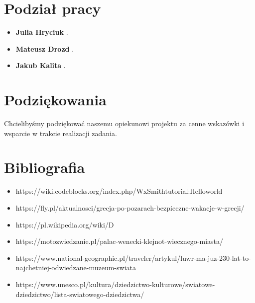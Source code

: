 \documentclass{article}
\begin{document}
	\section{Podział pracy}
\begin{itemize}
	\item \textbf {Julia Hryciuk} .
	\item \textbf {Mateusz Drozd} .
	\item \textbf {Jakub Kalita} .
\end{itemize}
	\section{Podziękowania}
	Chcielibyśmy podziękować naszemu opiekunowi projektu za cenne wskazówki i wsparcie w trakcie realizacji zadania.
	
	\section{Bibliografia}
\begin{itemize}
	\item https://wiki.codeblocks.org/index.php/WxSmithtutorial:Helloworld
	
	\item https://fly.pl/aktualnosci/grecja-po-pozarach-bezpieczne-wakacje-w-grecji/

	\item https://pl.wikipedia.org/wiki/D%
	
	\item https://motozwiedzanie.pl/palac-wenecki-klejnot-wiecznego-miasta/

	\item https://www.national-geographic.pl/traveler/artykul/luwr-ma-juz-230-lat-to-najchetniej-odwiedzane-muzeum-swiata

	\item https://www.unesco.pl/kultura/dziedzictwo-kulturowe/swiatowe-dziedzictwo/lista-swiatowego-dziedzictwa/
	

\end{itemize}
\end{document}
